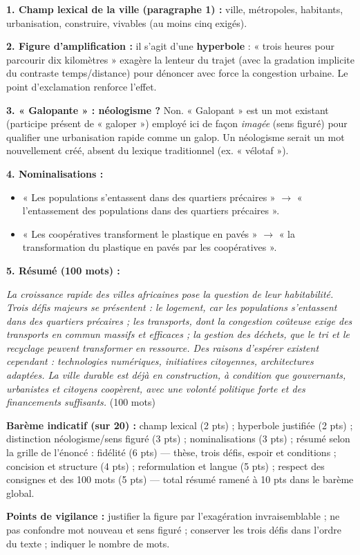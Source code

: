 \documentclass[11pt]{article}
\begin{document}
\begin{exoresolu}
\textbf{1. Champ lexical de la ville (paragraphe 1) :} ville, métropoles, habitants, urbanisation, construire, vivables (au moins cinq exigés).

\textbf{2. Figure d'amplification :} il s'agit d'une \textbf{hyperbole} : « trois heures pour parcourir dix kilomètres » exagère la lenteur du trajet (avec la gradation implicite du contraste temps/distance) pour dénoncer avec force la congestion urbaine. Le point d'exclamation renforce l'effet.

\textbf{3. « Galopante » : néologisme ?} Non. « Galopant » est un mot existant (participe présent de « galoper ») employé ici de façon \emph{imagée} (sens figuré) pour qualifier une urbanisation rapide comme un galop. Un néologisme serait un mot nouvellement créé, absent du lexique traditionnel (ex. « vélotaf »).

\textbf{4. Nominalisations :}
\begin{itemize}
\item « Les populations s'entassent dans des quartiers précaires » $\rightarrow$ « l'entassement des populations dans des quartiers précaires ».
\item « Les coopératives transforment le plastique en pavés » $\rightarrow$ « la transformation du plastique en pavés par les coopératives ».
\end{itemize}

\textbf{5. Résumé (100 mots) :}

\emph{La croissance rapide des villes africaines pose la question de leur habitabilité. Trois défis majeurs se présentent : le logement, car les populations s'entassent dans des quartiers précaires ; les transports, dont la congestion coûteuse exige des transports en commun massifs et efficaces ; la gestion des déchets, que le tri et le recyclage peuvent transformer en ressource. Des raisons d'espérer existent cependant : technologies numériques, initiatives citoyennes, architectures adaptées. La ville durable est déjà en construction, à condition que gouvernants, urbanistes et citoyens coopèrent, avec une volonté politique forte et des financements suffisants.} (100 mots)

\textbf{Barème indicatif (sur 20) :} champ lexical (2 pts) ; hyperbole justifiée (2 pts) ; distinction néologisme/sens figuré (3 pts) ; nominalisations (3 pts) ; résumé selon la grille de l'énoncé : fidélité (6 pts) — thèse, trois défis, espoir et conditions ; concision et structure (4 pts) ; reformulation et langue (5 pts) ; respect des consignes et des 100 mots (5 pts) — total résumé ramené à 10 pts dans le barème global.

\textbf{Points de vigilance :} justifier la figure par l'exagération invraisemblable ; ne pas confondre mot nouveau et sens figuré ; conserver les trois défis dans l'ordre du texte ; indiquer le nombre de mots.
\end{exoresolu}
\end{document}
